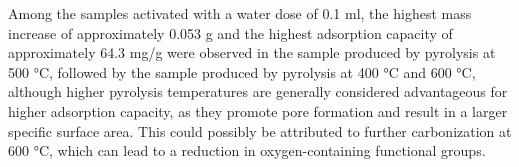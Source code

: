 \vspace{0.3em}

Among the samples activated with a water dose of 0.1 ml, the highest mass increase of approximately 0.053 g and the highest adsorption capacity of approximately 64.3 mg/g were observed in the sample produced by pyrolysis at 500 °C, followed by the sample produced by pyrolysis at 400 °C and 600 °C, although higher pyrolysis temperatures are generally considered advantageous for higher adsorption capacity, as they promote pore formation and result in a larger specific surface area. This could possibly be attributed to further carbonization at 600 °C, which can lead to a reduction in oxygen-containing functional groups.








